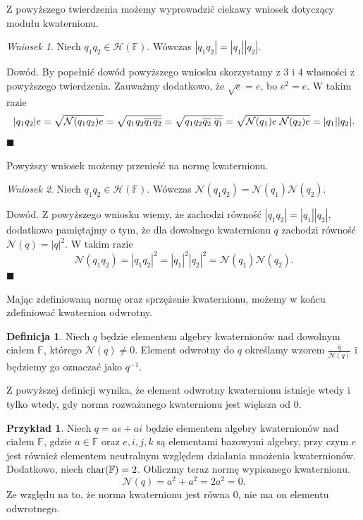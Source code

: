 \documentclass[a4paper,twoside,11pt,reqno]{mwrep}
\theoremstyle{plain} \newtheorem{twr}{Twierdzenie}
\theoremstyle{plain} \newtheorem{lem}{Lemat}
\theoremstyle{definition} \newtheorem{defi}{Definicja}
\theoremstyle{remark} \newtheorem*{wni}{Wniosek}
\theoremstyle{definition} \newtheorem{uwaga}{Uwaga}
\theoremstyle{definition}\newtheorem{prz}{Przykład}
\newenvironment{dowod}{\par\vspace{0.1cm}\par{\sc Dowód.}}{\hfill $\blacksquare$\par\vspace{0.4cm}\par}
\begin{document}
Z powyższego twierdzenia możemy wyprowadzić ciekawy wniosek dotyczący modułu kwaternionu. 
\begin{wni}
Niech $q_1q_2\in\mathcal{H}(\mathbb{F})$. Wówczas
$|q_1q_2|=|q_1||q_2|.$
\end{wni}
\begin{dowod}
By popełnić dowód powyższego wniosku skorzystamy z $\mathit{3}$ i $\mathit{4}$ własności z powyższego twierdzenia. Zauważmy
dodatkowo, że $\sqrt{e} = e$, bo $e^2 = e$. W takim razie
$$|q_1q_2|e =\sqrt{\mathcal{N}(q_1q_2)e}= \sqrt{q_1q_2\overline{q_1q_2}}=
\sqrt{q_1q_2\overline{q_2}\hspace{1mm}\overline{q_1}} = 
\sqrt{\mathcal{N}(q_1)e\hspace{1mm}\mathcal{N}(q_2)e}=|q_1||q_2|.$$
\end{dowod}
Powyższy wniosek możemy przenieść na normę kwaternionu.
\begin{wni}
Niech $q_1q_2\in\mathcal{H}(\mathbb{F})$. Wówczas
$\mathcal{N}(q_1q_2)=\mathcal{N}(q_1)\mathcal{N}(q_2).$
\end{wni}
\begin{dowod}
Z powyższego wniosku wiemy, że zachodzi równość $|q_1q_2| =|q_1||q_2|$,
dodatkowo pamiętajmy o tym, że dla dowolnego kwaternionu $q$ zachodzi równość 
$\mathcal{N}(q) =|q|^2$. W takim razie 
$$\mathcal{N}(q_1q_2) =|q_1q_2|^2 = |q_1|^2|q_2|^2 = \mathcal{N}(q_1)\mathcal{N}(q_2). $$   
\end{dowod}
Mając zdefiniowaną normę oraz sprzężenie kwaternionu, możemy w końcu zdefiniować kwaternion odwrotny.

\begin{defi}
Niech $q$ będzie elementem algebry kwaternionów nad dowolnym ciałem 
$\mathbb{F}$, którego $\mathcal{N}(q) \neq 0 $. Element odwrotny do $q$ określamy wzorem
$\frac{\overline{q}}{\mathcal{N}(q)}$ i będziemy go oznaczać jako $q^{-1}$.
\end{defi}

Z powyższej definicji wynika, że element odwrotny kwaternionu istnieje wtedy i tylko wtedy, gdy
norma rozważanego kwaternionu jest większa od $0$.

\begin{prz}
Niech $q  = ae+ai$ będzie elementem algebry kwaternionów nad ciałem 
$\mathbb{F}$, gdzie $a\in\mathbb{F}$ oraz $e,i,j,k$ są elementami bazowymi algebry, 
przy czym  $e$ jest również elementem neutralnym względem działania mnożenia kwaternionów.
Dodatkowo, niech $\textup{char}(\mathbb{F})=2$. Obliczmy teraz normę wypisanego kwaternionu.
$$\mathcal{N}(q) = a^2 +a^2 = 2a^2 = 0.$$
Ze względu na to, że norma kwaternionu jest równa $0$, nie ma on elementu odwrotnego.
\end{prz}
\end{document}
